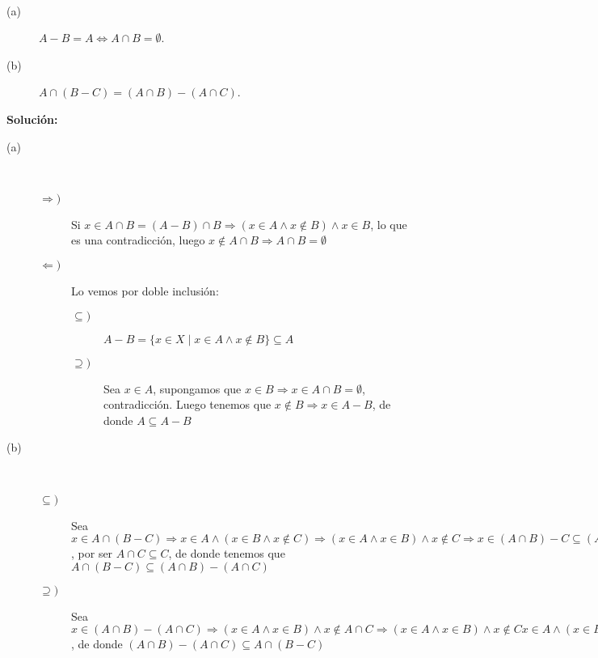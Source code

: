 \begin{ejercicio}
    \ 
    \begin{description}
        \item [(a)] $A-B=A\Longleftrightarrow A\cap B = \emptyset $.
        \item [(b)] $A\cap(B-C) = (A\cap B) - (A \cap C)$.
    \end{description}
    \textbf{Solución:}
    \begin{description}
        \item [(a)] \ 
            \begin{description}
                \item [$\Longrightarrow)$] Si $x\in A\cap B = (A-B)\cap B\Longrightarrow (x\in A\land x\notin B)\land x\in B$, lo que es una contradicción, luego $x\notin A\cap B\Longrightarrow A\cap B=\emptyset $
                \item [$\Longleftarrow)$] Lo vemos por doble inclusión:
                    \begin{description}
                        \item [$\subseteq)$] $A-B=\{x\in X\mid x\in A\land x\notin B\} \subseteq A$
                        \item [$\supseteq)$] Sea $x\in A$, supongamos que $x\in B \Longrightarrow x\in A\cap B=\emptyset $, contradicción. Luego tenemos que $x\notin B\Longrightarrow x\in A-B$, de donde $A\subseteq A-B$
                    \end{description}
            \end{description}
        \item [(b)] \ 
            \begin{description}
                \item [$\subseteq)$] Sea $x\in A\cap (B-C)\Longrightarrow x\in A\land (x\in B\land x\notin C)\Longrightarrow {(x\in A\land x\in B)}\land {x\notin C}\Longrightarrow x\in (A\cap B)-C\subseteq (A\cap B)-(A\cap C)$, por ser $A\cap C\subseteq C$, de donde tenemos que $A\cap (B-C)\subseteq (A\cap B) - (A \cap C)$
                \item [$\supseteq)$] Sea $x\in (A\cap B)-(A\cap C)\Longrightarrow {(x\in A\land x\in B)}\land x\notin A\cap C\Longrightarrow {(x\in A\land x\in B)}\land x\notin C x\in A\land {(x\in B\land x\notin C)} \Longrightarrow x\in A\cap (B-C)$, de donde $(A\cap B) - (A \cap C)\subseteq A\cap (B-C)$
            \end{description}
    \end{description}
\end{ejercicio}

